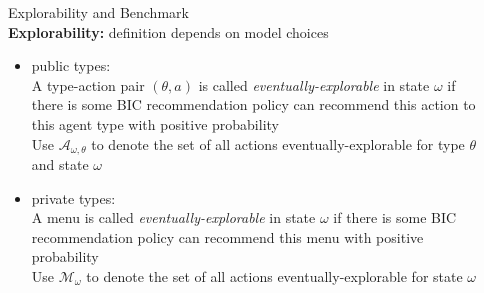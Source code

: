 \documentclass[final]{beamer}
\newlength{\sepwid}
\newlength{\onecolwid}
\newlength{\twocolwid}
\begin{document}
\begin{frame}[t]
\begin{columns}[t]
\begin{column}{\sepwid}\end{column} %









\begin{columns}[t,totalwidth=\twocolwid] %

\begin{column}{\onecolwid} %


\begin{block}{Explorability and Benchmark}
~\\
\textbf{Explorability:} definition depends on model choices
\begin{itemize}
\item public types: \\
A type-action pair $(\theta, a)$ is called \emph{eventually-explorable} in state $\omega$ if there is some BIC recommendation policy can recommend this action to this agent type with positive probability\\
Use $\mathcal{A}_{\omega, \theta}$ to denote the set of all actions eventually-explorable for type $\theta$ and state $\omega$ 
\item private types: \\
A menu is called \emph{eventually-explorable} in state $\omega$ if there is some BIC recommendation policy can recommend this menu with positive probability\\
Use $\mathcal{M}_{\omega}$ to denote the set of all actions eventually-explorable for state $\omega$ 
\end{itemize}


\end{block}
\end{column}
\end{columns}
\end{columns}
\end{frame}
\end{document}
